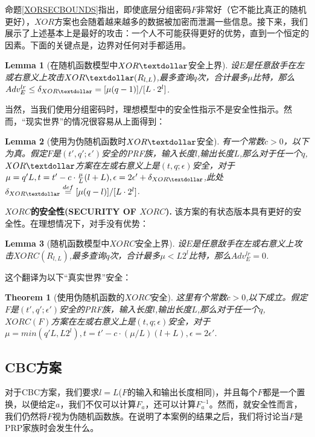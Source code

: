 \documentclass[]{article}
\newtheorem{theorem}{Theorem}
\newtheorem{lemma}{Lemma}
\begin{document}
命题\ref{XORSECBOUNDS}指出，即使底层分组密码$F$非常好（它不能比真正的随机更好），$XOR$方案也会随着越来越多的数据被加密而泄漏一些信息。接下来，我们展示了上述基本上是最好的攻击：一个人不可能获得更好的优势，直到一个恒定的因素。下面的关键点是，边界对任何对手都适用。

\begin{lemma}[在随机函数模型中$XOR\textdollar$安全上界]
	设$E$是任意敌手在左或右意义上攻击$XOR\textdollar(R_{l,L})$,最多查询$q$次，合计最多$\mu$比特，那么$Adv^{lr}_E \leq \delta_{XOR\textdollar}=[\mu (q-1)]/[L\cdot 2^l]$.
\end{lemma}

当然，当我们使用分组密码时，理想模型中的安全性指示不是安全性指示。然而，“现实世界”的情况很容易从上面得到：

\begin{lemma}[使用为伪随机函数时$XOR\textdollar$安全]
	有一个常数$c>0$，以下为真。假定$F$是$(t',q';\epsilon')$安全的PRF族，输入长度$l$,输出长度$L$,那么对于任一个$q$,$XOR\textdollar$方案在左或右意义上是$(t,q;\epsilon)$安全，对于$\mu=q' L,t=t'-c\cdot \frac{\mu}{L}(l+L),\epsilon=2\epsilon'+\delta_{XOR\textdollar}$,此处$\delta_{XOR\textdollar}\stackrel{def}{=}[\mu(q-l)]/[L\cdot 2^l]$.
\end{lemma}

\textbf{{\large $XORC$的安全性(SECURITY OF $XORC$).}}  
该方案的有状态版本具有更好的安全性。在理想情况下，对手没有优势：

\begin{lemma}[随机函数模型中$XORC$安全上界]
	设$E$是任意敌手在左或右意义上攻击$XORC(R_{l,L})$,最多查询$q$次，合计最多$\mu< L2^l$比特，那么$Adv^{lr}_E =0$.
\end{lemma}

这个翻译为以下“真实世界”安全：

\begin{theorem}[使用伪随机函数的$XORC$安全]
	这里有个常数$c>0$,以下成立。假定$F$是$(t',q';\epsilon')$安全的PRF族，输入长度$l$,输出长度$L$,那么对于任一个$q$,$XORC(F)$方案在左或右意义上是$(t,q;\epsilon)$安全，对于$\mu=min(q' L,L2^l),t=t'-c\cdot(\mu/L)(l+L) ,\epsilon=2\epsilon'$.
\end{theorem}

\subsection{CBC方案}

对于CBC方案，我们要求$l=L$($F$的输入和输出长度相同)，并且每个$F$都是一个置换，以便给定$a$，我们不仅可以计算$F_a$，还可以计算$F^{-1}_a$。然而，就安全性而言，我们仍然将$F$视为伪随机函数族。在说明了本案例的结果之后，我们将讨论当$F$是PRP家族时会发生什么。
\end{document}
